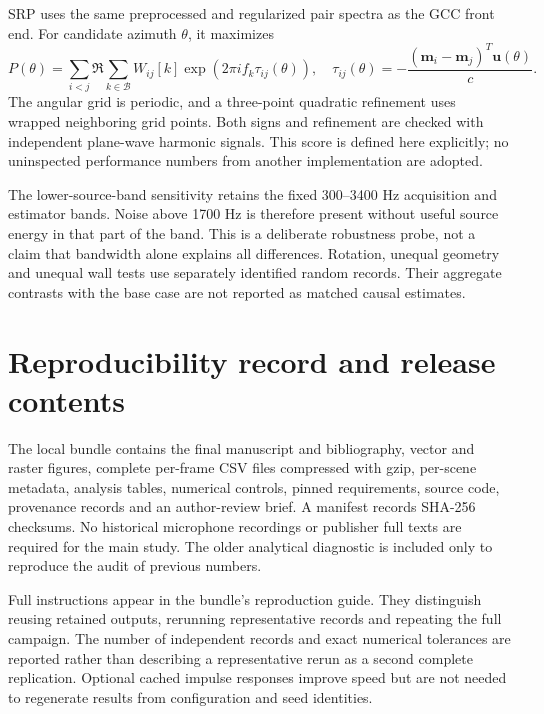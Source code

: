 \documentclass[10pt,a4paper]{article}
\begin{document}
SRP uses the same preprocessed and regularized pair spectra as the GCC front end. For candidate azimuth $\theta$, it maximizes
\begin{equation}
P(\theta)=\sum_{i<j}\Re\sum_{k\in\mathcal B}W_{ij}[k]
 \exp\left(2\pi i f_k\tau_{ij}(\theta)\right),\quad
\tau_{ij}(\theta)=-\frac{(\mathbf m_i-\mathbf m_j)^T\mathbf u(\theta)}{c}.
\end{equation}
The angular grid is periodic, and a three-point quadratic refinement uses wrapped neighboring grid points. Both signs and refinement are checked with independent plane-wave harmonic signals. This score is defined here explicitly; no uninspected performance numbers from another implementation are adopted.

The lower-source-band sensitivity retains the fixed 300--3400 Hz acquisition and estimator bands. Noise above 1700 Hz is therefore present without useful source energy in that part of the band. This is a deliberate robustness probe, not a claim that bandwidth alone explains all differences. Rotation, unequal geometry and unequal wall tests use separately identified random records. Their aggregate contrasts with the base case are not reported as matched causal estimates.

\section{Reproducibility record and release contents}
The local bundle contains the final manuscript and bibliography, vector and raster figures, complete per-frame CSV files compressed with gzip, per-scene metadata, analysis tables, numerical controls, pinned requirements, source code, provenance records and an author-review brief. A manifest records SHA-256 checksums. No historical microphone recordings or publisher full texts are required for the main study. The older analytical diagnostic is included only to reproduce the audit of previous numbers.



Full instructions appear in the bundle's reproduction guide. They distinguish reusing retained outputs, rerunning representative records and repeating the full campaign. The number of independent records and exact numerical tolerances are reported rather than describing a representative rerun as a second complete replication. Optional cached impulse responses improve speed but are not needed to regenerate results from configuration and seed identities.
\end{document}
